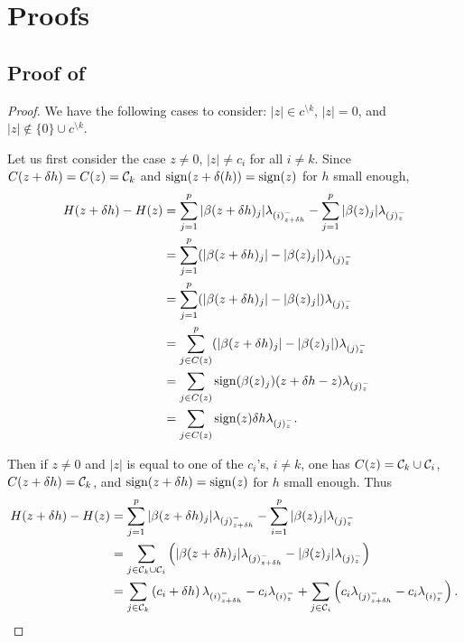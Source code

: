 \section{Proofs}\label{sec:proofs}

\subsection{Proof of }

\begin{proof}\label{app:proof_directional_derivative}
  \label{app:proof_directional_slope}
  We have the following cases to consider: \(|z| \in c^{\setminus k}\),
  \(|z| = 0\), and \(|z| \notin \{0\} \cup c^{\setminus k}\).


  Let us first consider the case $z \neq 0$, $|z| \neq c_i$ for all $i \neq k$.
  Since \(C(z + \delta h) = C(z) = \mathcal{C}_k\) and $\operatorname{sign}(z + \delta(h)) = \operatorname{sign}(z)$ for $h$ small enough,
  \begin{align*}
    H(z + \delta h) - H(z)
      &= \sum_{j =1}^p |\beta(z + \delta h)_j| \lambda_{(i)^-_{z + \delta h}}
          - \sum_{j=1}^p |\beta(z)_j| \lambda_{(j)^-_z} \\
      &= \sum_{j =1}^p (|\beta(z + \delta h)_j| - |\beta(z)_j|) \lambda_{(j)^-_z} \\
      &= \sum_{j =1}^p (|\beta(z + \delta h)_j| - |\beta(z)_j|) \lambda_{(j)^-_z} \\
      &= \sum_{j \in C(z)}^p (|\beta(z + \delta h)_j| - |\beta(z)_j|) \lambda_{(j)^-_z} \\
      &= \sum_{j \in C(z)} \operatorname{sign}(\beta(z)_j) (z + \delta h - z) \lambda_{(j)^-_z} \\
      &= \sum_{j \in C(z)} \operatorname{sign}(z) \delta h  \lambda_{(j)^-_z}.
  \end{align*}

  Then if  $z \neq 0$ and $|z|$ is equal to one of the $c_i$'s, $i \neq k$,  one has $C(z) = \mathcal{C}_k \cup \mathcal{C}_i$, $C(z + \delta h) = \mathcal{C}_k$, and $\operatorname{sign}(z + \delta h) = \operatorname{sign}(z)$ for $h$ small enough.
  Thus
  \begin{align}
    H(z + \delta h) - H(z)
      &= \sum_{j =1}^p |\beta(z + \delta h)_j| \lambda_{(j)^-_{z + \delta h}}
          - \sum_{i=1}^p |\beta(z)_j| \lambda_{(j)^-_z}  \nonumber \\
      &= \sum_{j \in \mathcal{C}_k \cup \mathcal{C}_i} \left( |\beta(z + \delta h)_j| \lambda_{(j)^-_{z + \delta h}}
         - |\beta(z)_j| \lambda_{(j)^-_z} \right)  \nonumber \\
      &= \sum_{j \in \mathcal{C}_k} \left( c_i + \delta h \right) \lambda_{(i)^-_{z + \delta h}}
           - c_i \lambda_{(i)^-_z} 
           + \sum_{j \in \mathcal{C}_i} \left( c_i \lambda_{(j)^-_{z + \delta h}}
           - c_i \lambda_{(i)^-_z} \right). \nonumber 
  \end{align}


\end{proof}
